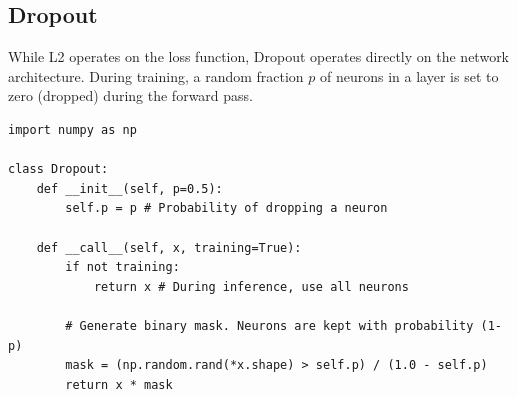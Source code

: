 \documentclass{tufte-handout}
\begin{document}
\subsection{Dropout}

While L2 operates on the loss function, Dropout operates directly on the network architecture. During training, a random fraction $p$ of neurons in a layer is set to zero (dropped) during the forward pass. 

\begin{lstlisting}[caption={Dropout implementation in \texttt{mini\_nn/nn\_utils.py}.}]
import numpy as np

class Dropout:
    def __init__(self, p=0.5):
        self.p = p # Probability of dropping a neuron
        
    def __call__(self, x, training=True):
        if not training:
            return x # During inference, use all neurons
        
        # Generate binary mask. Neurons are kept with probability (1-p)
        mask = (np.random.rand(*x.shape) > self.p) / (1.0 - self.p)
        return x * mask
\end{lstlisting}

\begin{marginfigure}[-4.0cm]
\centering
{}
\caption{Dropout during training. Active paths are solid; dropped paths are dashed.}
\label{fig:dropout}
\end{marginfigure}
\end{document}
